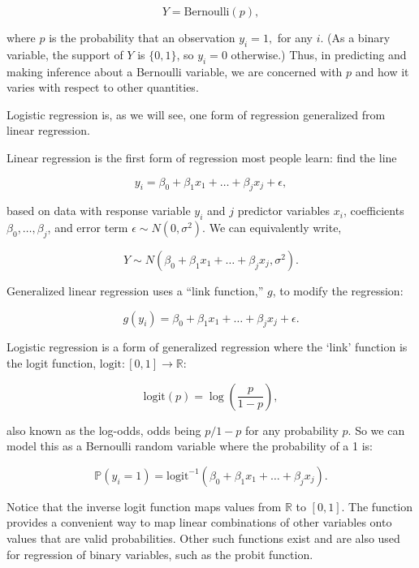 \documentclass[12pt,twoside]{reedthesis}
\begin{document}
  \[Y = \text{Bernoulli}(p),\]
  
  where \(p\) is the probability that an observation \(y_i = 1,\) for any
  \(i\). (As a binary variable, the support of \(Y\) is \(\{0,1\}\), so
  \(y_i = 0\) otherwise.) Thus, in predicting and making inference about a
  Bernoulli variable, we are concerned with \(p\) and how it varies with
  respect to other quantities.
  
  Logistic regression is, as we will see, one form of regression
  generalized from linear regression.
  
  Linear regression is the first form of regression most people learn:
  find the line
  
  \[y_i = \beta_0 + \beta_1 x_1 + \ldots + \beta_j x_j + \epsilon,\]
  
  based on data with response variable \(y_i\) and \(j\) predictor
  variables \(x_i\), coefficients \(\beta_0, \ldots, \beta_j\), and error
  term \(\epsilon \sim N(0, \sigma^2)\). We can equivalently write,
  
  \[Y \sim N(\beta_0 + \beta_1 x_1 + \ldots + \beta_j x_j, \sigma^2).\]
  
  Generalized linear regression uses a ``link function,'' \(g\), to modify
  the regression:
  
  \[g(y_i) = \beta_0 + \beta_1 x_1 + \ldots + \beta_j x_j + \epsilon.\]
  
  Logistic regression is a form of generalized regression where the `link'
  function is the logit function, \(\text{logit}:[0,1] \to \mathbb{R}\):
  
  \[ \text{logit} (p) = \log \left(\frac{p}{1-p}\right), \]
  
  also known as the log-odds, odds being \(p/1-p\) for any probability
  \(p\). So we can model this as a Bernoulli random variable where the
  probability of a 1 is:
  
  \[\mathbb{P} (y_i = 1) = \text{logit}^{-1} (\beta_0 + \beta_1 x_1 + \ldots + \beta_j x_j).\]
  
  Notice that the inverse logit function maps values from \(\mathbb{R}\)
  to \([0,1]\). The function provides a convenient way to map linear
  combinations of other variables onto values that are valid
  probabilities. Other such functions exist and are also used for
  regression of binary variables, such as the probit function.
  
\end{document}
